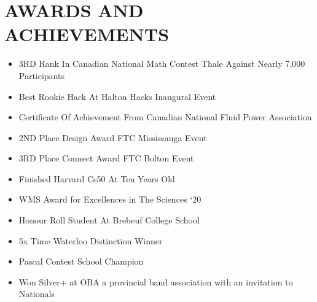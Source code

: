 \documentclass[a4paper,10pt]{article}
\begin{document}
\section*{AWARDS AND ACHIEVEMENTS}
\begin{itemize}[leftmargin=*]
    \item 3RD Rank In Canadian National Math Contest Thale Against Nearly 7,000 Participants
    \item Best Rookie Hack At Halton Hacks Inaugural Event
    \item Certificate Of Achievement From Canadian National Fluid Power Association
    \item 2ND Place Design Award FTC Mississauga Event
    \item 3RD Place Connect Award FTC Bolton Event
    \item Finished Harvard Cs50 At Ten Years Old
    \item WMS Award for Excellences in The Sciences ‘20
    \item Honour Roll Student At Brebeuf College School
    \item 5x Time Waterloo Distinction Winner
    \item Pascal Contest School Champion
    \item Won Silver+ at OBA a provincial band association with an invitation to Nationals
\end{itemize}
\end{document}
